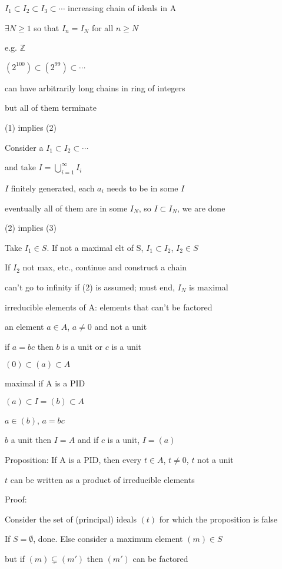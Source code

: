 \documentclass[12pt]{article}
\begin{document}
$I_1 \subset I_2 \subset I_3 \subset \cdots$ increasing chain of ideals in A

$\exists N \geq 1$ so that $I_n = I_N$ for all $n \geq N$

\noindent
e.g. $\mathds{Z}$

$(2^{100}) \subset (2^{99}) \subset \cdots$

can have arbitrarily long chains in ring of integers

but all of them terminate

\noindent
(1) implies (2)

Consider a $I_1 \subset I_2 \subset \cdots$

and take $I = \bigcup_{i = 1}^\infty I_i$

$I$ finitely generated, each $a_i$ needs to be in some $I$

eventually all of them are in some $I_N$, so $I \subset I_N$, we are done

\noindent
(2) implies (3)

Take $I_1 \in S$.  If not a maximal elt of S, $I_1 \subset I_2$, $I_2 \in S$

If $I_2$ not max, etc., continue and construct a chain

can't go to infinity if (2) is assumed; must end, $I_N$ is maximal

\noindent
irreducible elements of A: elements that can't be factored

an element $a \in A$, $a \neq 0$ and not a unit

if $a = bc$ then $b$ is a unit or $c$ is a unit

\noindent
$(0) \subset (a) \subset A$

maximal if A is a PID

$(a) \subset I = (b) \subset A$

$a \in (b)$, $a = bc$

$b$ a unit then $I = A$ and if $c$ is a unit, $I = (a)$

\noindent
Proposition: If A is a PID, then every $t \in A$, $t \neq 0$, $t$ not a unit

$t$ can be written as a product of irreducible elements

\noindent
Proof:

Consider the set of (principal) ideals $(t)$ for which the proposition is false

If $S = \emptyset$, done.  Else consider a maximum element $(m) \in S$

but if $(m) \subsetneq (m')$ then $(m')$ can be factored
\end{document}
